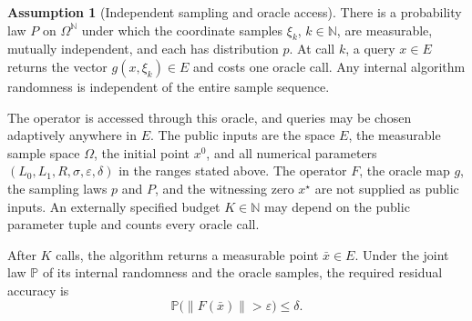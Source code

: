 \documentclass[10pt]{article}
\theoremstyle{definition}
\newtheorem{assumption}{Assumption}
\begin{document}
\begin{assumption}[Independent sampling and oracle access]
There is a probability law $P$ on $\Omega^{\mathbb{N}}$ under which the coordinate samples $\xi_k$, $k\in\mathbb{N}$, are measurable, mutually independent, and each has distribution $p$. At call $k$, a query $x\in E$ returns the vector $g(x,\xi_k)\in E$ and costs one oracle call. Any internal algorithm randomness is independent of the entire sample sequence.
\end{assumption}

The operator is accessed through this oracle, and queries may be chosen adaptively anywhere in $E$. The public inputs are the space $E$, the measurable sample space $\Omega$, the initial point $x^0$, and all numerical parameters $(L_0,L_1,R,\sigma,\varepsilon,\delta)$ in the ranges stated above. The operator $F$, the oracle map $g$, the sampling laws $p$ and $P$, and the witnessing zero $x^\star$ are not supplied as public inputs. An externally specified budget $K\in\mathbb{N}$ may depend on the public parameter tuple and counts every oracle call.

After $K$ calls, the algorithm returns a measurable point $\bar{x}\in E$. Under the joint law $\mathbb{P}$ of its internal randomness and the oracle samples, the required residual accuracy is
\[
\mathbb{P}\bigl(\|F(\bar{x})\|>\varepsilon\bigr)\leq\delta.
\]
\end{document}
